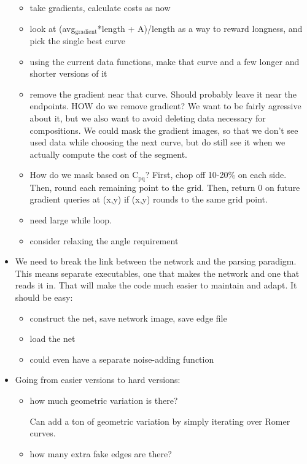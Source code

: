\documentclass{book}
\begin{document}
\begin{itemize}
\begin{itemize}
\item take gradients, calculate costs as now
\item look at (avg$_{\mathrm{gradient}}$*length + A)/length as a way to reward
      longness, and pick the single best curve
\item using the current data functions, make that curve and a few
      longer and shorter versions of it
\item remove the gradient near that curve. Should probably leave it
      near the endpoints. HOW do we remove gradient? We want to be
      fairly agressive about it, but we also want to avoid deleting
      data necessary for compositions. We could mask the gradient
      images, so that we don't see used data while choosing the next
      curve, but do still see it when we actually compute the cost of
      the segment.
\item How do we mask based on C$_{\mathrm{pq}}$? First, chop off 10-20\% on each
      side. Then, round each remaining point to the grid. Then, return
      0 on future gradient queries at (x,y) if (x,y) rounds to the
      same grid point.
\item need large while loop.
\item consider relaxing the angle requirement
\end{itemize}

\item We need to break the link between the network and the parsing
    paradigm. This means separate executables, one that makes the
    network and one that reads it in. That will make the code much
    easier to maintain and adapt. It should be easy:

\begin{itemize}
\item construct the net, save network image, save edge file
\item load the net
\item could even have a separate noise-adding function
\end{itemize}

\item Going from easier versions to hard versions:

\begin{itemize}
\item how much geometric variation is there?

      Can add a ton of geometric variation by simply iterating over
      Romer curves.
\item how many extra fake edges are there?


\end{itemize}
\end{itemize}
\end{document}
